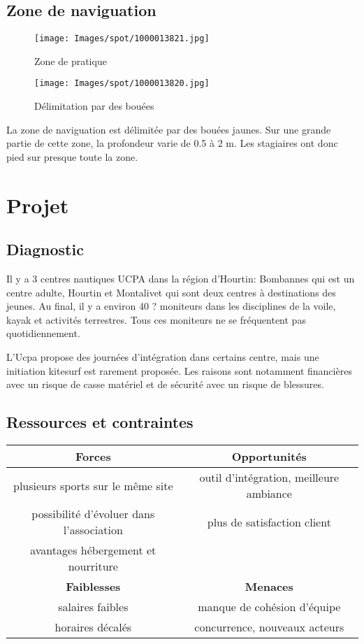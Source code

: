 \documentclass[12pt,a4paper]{report}
\begin{document}
\subsection{Zone de naviguation}
\begin{figure}
\begin{minipage}{0.4\textwidth}
\texttt{[image: Images/spot/1000013821.jpg]} 
\caption{Zone de pratique}
\end{minipage}
\hfill
\begin{minipage}{0.4\textwidth}
\texttt{[image: Images/spot/1000013820.jpg]} 
\caption{Délimitation par des bouées}
\end{minipage}
\end{figure}
La zone de naviguation est délimitée par des bouées jaunes.
Sur une grande partie de cette zone, la profondeur varie de 0.5 à 2 m.
Les stagiaires ont donc pied sur presque toute la zone.
\section{Projet}
\subsection{Diagnostic}
Il y a 3 centres nautiques UCPA dans la région d'Hourtin: Bombannes qui est
un centre adulte, Hourtin et Montalivet qui sont deux centres à destinations des jeunes.
Au final, il y a environ 40 ? moniteurs dans les disciplines de la voile, kayak et
activités terrestres. Tous ces moniteurs ne se fréquentent pas quotidiennement.

L'Ucpa propose des journées d'intégration dans certains centre, mais
une initiation kitesurf est rarement proposée. Les raisons sont notamment
financières avec un risque de casse matériel
et de sécurité avec un risque de blessures.
\subsection{Ressources et contraintes}
\begin{tabular}{|c|c|}
        \hline
        \textbf{Forces}                          & \textbf{Opportunités} \\ 
        \hline
        plusieurs sports sur le m\^eme site      &  outil d'intégration, meilleure ambiance\\
        possibilité d'évoluer dans l'association & plus de satisfaction client  \\
        avantages hébergement et nourriture      &                              \\
        \hline
        \textbf{Faiblesses}                      &  \textbf{Menaces} \\ 
        \hline
        salaires faibles                         & manque de cohésion d'équipe \\
        horaires décalés                         & concurrence, nouveaux acteurs   \\
        \hline
\end{tabular}
\end{document}
